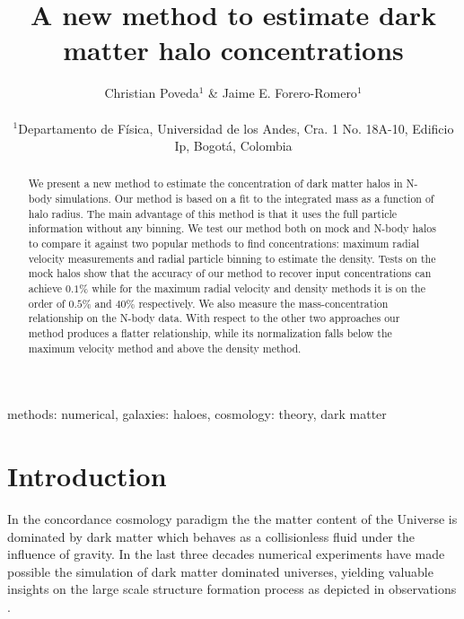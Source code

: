 \documentclass[useAMS,usenatbib]{mn2e}
\begin{document}
\title[A new method for concentrations]{A new method to estimate
  dark matter halo concentrations}
\author[Poveda \& Forero-Romero]{
\parbox[t]{\textwidth}{\raggedright
  Christian Poveda$^{1}$ \&
  Jaime E. Forero-Romero$^{1}$
}
\vspace*{6pt}\\
$^{1}$Departamento de F\'{i}sica, Universidad de los Andes, Cra. 1
No. 18A-10, Edificio Ip, Bogot\'a, Colombia\\
}
\maketitle

\begin{abstract}

We present a new method to estimate the concentration of dark matter
halos in N-body simulations. Our method is based on a fit to the
integrated mass as a function of halo radius.
The main advantage of this method is that it uses the full particle information
without any binning.
We test our method both on mock and N-body halos to compare it against
two popular methods to find concentrations: maximum radial velocity
measurements and radial particle binning to estimate the density.
Tests on the mock halos show that the accuracy of our method to
recover input concentrations can achieve $0.1\%$ while for the maximum
radial velocity and density methods it is on the order of $0.5\%$ and
$40\%$ respectively.
We also measure the mass-concentration relationship on the N-body
data. With respect to the other two approaches our method produces a
flatter relationship, while its normalization falls below the maximum
velocity method and above the density method.



\end{abstract}
\begin{keywords}
methods: numerical, galaxies: haloes, cosmology: theory, dark
matter
\end{keywords}


\section{Introduction}
\label{sec:introduction}
In the concordance cosmology paradigm the the matter content of the
Universe is dominated by dark matter which behaves as a collisionless
fluid under the influence of gravity. In the last three decades
numerical experiments have made possible the simulation of dark matter
dominated universes, yielding valuable insights on the large scale
structure formation process as depicted in observations
\citep{Springel2005,2011ApJ...740..102K}. 
\end{document}
